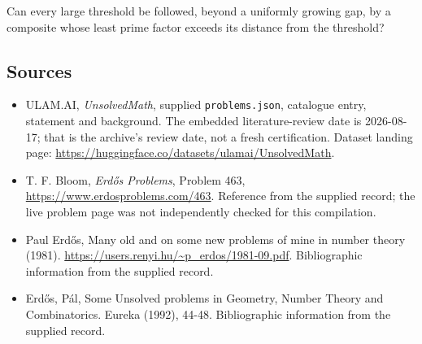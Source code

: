 \documentclass[11pt,a4paper]{article}
\begin{document}
Can every large threshold be followed, beyond a uniformly growing gap, by a composite whose least prime factor exceeds its distance from the threshold?

\subsection{Sources}

{\small

\begin{itemize}

\item[\hypertarget{source:statement:1}{S1}] ULAM.AI, \emph{UnsolvedMath}, supplied \texttt{problems.json}, catalogue entry, statement and background. The embedded literature-review date is 2026-08-17; that is the archive’s review date, not a fresh certification. Dataset landing page: \url{https://huggingface.co/datasets/ulamai/UnsolvedMath}.

\item[\hypertarget{source:statement:2}{S2}] T. F. Bloom, \emph{Erdős Problems}, Problem 463, \url{https://www.erdosproblems.com/463}. Reference from the supplied record; the live problem page was not independently checked for this compilation.

\item[\hypertarget{source:statement:3}{S3}] Paul Erdős, Many old and on some new problems of mine in number theory (1981). \url{https://users.renyi.hu/~p_erdos/1981-09.pdf}. Bibliographic information from the supplied record.

\item[\hypertarget{source:statement:4}{S4}] Erd\H{o}s, P\'{a}l, Some Unsolved problems in Geometry, Number Theory and Combinatorics. Eureka (1992), 44-48. Bibliographic information from the supplied record.

\end{itemize}

}

\label{end:statement}
\end{document}
